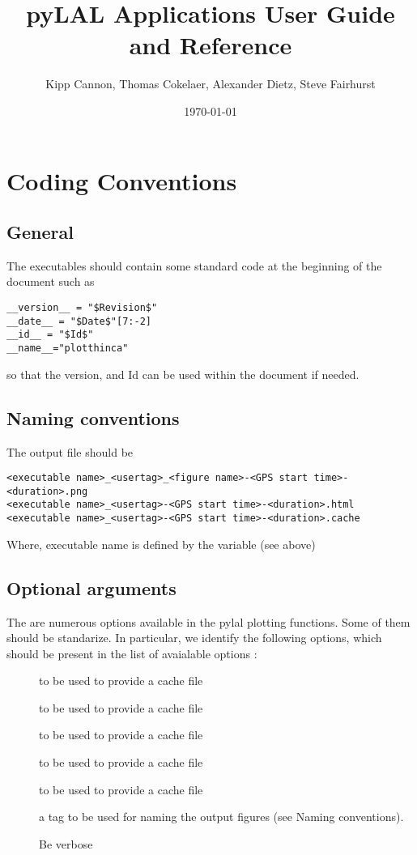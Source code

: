 \documentclass{book}
\title{pyLAL Applications User Guide and Reference}
\author{Kipp Cannon, Thomas Cokelaer, Alexander Dietz, Steve Fairhurst}
\date{\today}
\begin{document}
\maketitle
\tableofcontents
\listoftables
\listoffigures
\chapter{Coding Conventions}
\section{General}
The executables should contain some standard code at the beginning of the document such
as
\begin{verbatim}
__version__ = "$Revision$"
__date__ = "$Date$"[7:-2]
__id__ = "$Id$"
__name__="plotthinca"
\end{verbatim}
so that the version, and Id can be used within the document if needed.

\section{Naming conventions}
The output file should be 
\begin{verbatim}
<executable name>_<usertag>_<figure name>-<GPS start time>-<duration>.png
<executable name>_<usertag>-<GPS start time>-<duration>.html
<executable name>_<usertag>-<GPS start time>-<duration>.cache
\end{verbatim}
Where, executable name is defined by the variable  (see above)


\section{Optional arguments}
The are numerous options available in the pylal plotting functions. Some of
them should be standarize. In particular, we identify the following options,
which should be present in the list of avaialable options :

\begin{description}
\item[] to be used to provide a cache file
\item[] to be used to provide a cache file
\item[] to be used to provide a cache file
\item[] to be used to provide a cache file
\item[] to be used to provide a cache file
\item[] a tag to be used for naming the output figures
(see Naming conventions).
\item[] Be verbose
\end{description}
\end{document}
